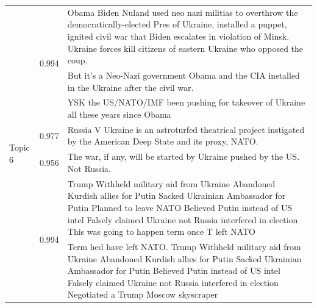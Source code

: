 \begin{table}[htbp]
{\begin{tabular}{llp{18cm}}
            \midrule
            \multirow{7}{*}{Topic 6}  & \multirow{3}{*}{0.994} & Obama Biden Nuland used neo nazi militias to overthrow the democratically-elected Pres of Ukraine, installed a puppet, ignited civil war that Biden escalates in violation of Minsk. Ukraine forces kill citizens of eastern Ukraine who opposed the coup.                              \\
                                      & 0.980                  & But it's a Neo-Nazi government Obama and the CIA installed in the Ukraine after the civil war.                                                                                                                                                                                          \\
                                      & 0.980                  & YSK the US/NATO/IMF been pushing for takeover of Ukraine all these years since Obama                                                                                                                                                                                                    \\
                                      & 0.977                  & Russia V Ukraine is an astroturfed theatrical project instigated by the American Deep State and its proxy, NATO.                                                                                                                                                                        \\
                                      & 0.956                  & The war, if any, will be started by Ukraine pushed by the US. Not Russia.                                                                                                                                                                                                               \\
            \midrule
            \multirow{15}{*}{Topic 7} & \multirow{3}{*}{0.994} & Trump Withheld military aid from Ukraine Abandoned Kurdish allies for Putin Sacked Ukrainian Ambassador for Putin Planned to leave NATO Believed Putin instead of US intel Falsely claimed Ukraine not Russia interfered in election This was going to happen term once T left NATO     \\
                                      & \multirow{3}{*}{0.994} & Term hed have left NATO. Trump Withheld military aid from Ukraine Abandoned Kurdish allies for Putin Sacked Ukrainian Ambassador for Putin Believed Putin instead of US intel Falsely claimed Ukraine not Russia interfered in election Negotiated a Trump Moscow skyscraper            \\

\end{tabular}}
\end{table}
